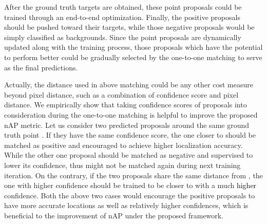 \documentclass[10pt,twocolumn,letterpaper]{article}
\newcommand{\ywu}[1]{\textcolor{black}{#1}}
\begin{document}
After the ground truth targets are obtained, these point proposals could be trained through an end-to-end optimization. Finally, the positive proposals should be pushed toward their targets, while those negative proposals would be simply classified as backgrounds. Since the point proposals are dynamically updated along with the training process, those proposals which have the potential to perform better could be gradually selected by the one-to-one matching to serve as the final predictions.

Actually, the distance used in above matching could be any other cost measure beyond pixel distance, such as a combination of confidence score and pixel distance. We empirically show that taking confidence scores of proposals into consideration during the one-to-one matching is helpful to improve the proposed nAP metric. Let us consider two predicted proposals around the same ground truth point . If they have the same confidence score, the one closer to  should be matched as positive and encouraged to achieve higher localization accuracy. While the other one proposal should be matched as negative and supervised to lower its confidence, thus might not be matched again during next training iteration. On the contrary, if the two proposals share the same distance from , the one with higher confidence should be trained to be closer to  with a much \ywu{higher} confidence. Both the above two cases would encourage the positive proposals to have more accurate locations as well as relatively higher confidences, which is beneficial to the improvement of nAP under the proposed framework. 
\end{document}

